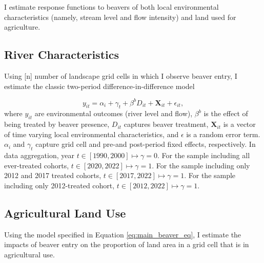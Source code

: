 I estimate response functions to beavers of both local environmental characteristics (namely, stream level and flow intensity) and land used for agriculture.

\subsection{River Characteristics}

Using [n] number of landscape grid cells in which I observe beaver entry, I estimate the classic two-period difference-in-difference model

\begin{equation} \label{eq:main_beaver_eq}
y_{it} = \alpha_i + \gamma_t + \beta^{b}D_{it} + \mathbf{X}_{it} + \epsilon_{it},
\end{equation}
where $y_{it}$ are environmental outcomes (river level and flow), $\beta^b$ is the effect of being treated by beaver presence, $D_{it}$ captures beaver treatment, $\mathbf{X}_{it}$ is a vector of time varying local environmental characteristics, and $\epsilon$ is a random error term. $\alpha_i$ and $\gamma_t$ capture grid cell and pre-and post-period fixed effects, respectively. In data aggregation, year $t \in [1990, 2000] \mapsto \gamma = 0$. For the sample including all ever-treated cohorts, $t \in [2020, 2022] \mapsto \gamma = 1$. For the sample including only 2012 and 2017 treated cohorts, $t \in [2017, 2022] \mapsto \gamma = 1$. For the sample including only 2012-treated cohort, $t \in [2012, 2022] \mapsto \gamma = 1$.



\subsection{Agricultural Land Use}

Using the model specified in Equation \eqref{eq:main_beaver_eq}, I estimate the impacts of beaver entry on the proportion of land area in a grid cell that is in agricultural use. 